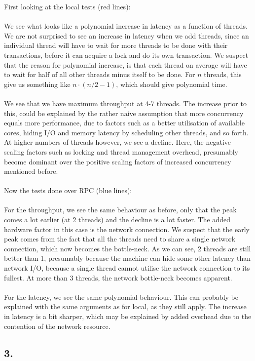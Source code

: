 \documentclass[12pt]{article}
\begin{document}
First looking at the local tests (red lines):
\\
\\
We see what looks like a polynomial increase in latency as a function of threads. We are not surprised to see an increase in latency when we add threads, since an individual thread will have to wait for more threads to be done with their transactions, before it can acquire a lock and do its own transaction. We suspect that the reason for polynomial increase, is that each thread on average will have to wait for half of all other threads minus itself to be done. For $n$ threads, this give us something like $n\cdot(n/2-1)$, which should give polynomial time.
\\
\\
We see that we have maximum throughput at 4-7 threads. The increase prior to this, could be explained by the rather naive assumption that more concurrency equals more performance, due to factors such as a better utilisation of available cores, hiding I/O and memory latency by scheduling other threads, and so forth. At higher numbers of threads however, we see a decline. Here, the negative scaling factors such as locking and thread management overhead, presumably become dominant over the positive scaling factors of increased concurrency mentioned before.
\\
\\
Now the tests done over RPC (blue lines):
\\
\\
For the throughput, we see the same behaviour as before, only that the peak comes a lot earlier (at 2 threads) and the decline is a lot faster. The added hardware factor in this case is the network connection. We suspect that the early peak comes from the fact that all the threads need to share a single network connection, which now becomes the bottle-neck. As we can see, 2 threads are still better than 1, presumably because the machine can hide some other latency than network I/O, because a single thread cannot utilise the network connection to its fullest. At more than 3 threads, the network bottle-neck becomes apparent.
\\
\\
For the latency, we see the same polynomial behaviour. This can probably be explained with the same arguments as for local, as they still apply. The increase in latency is a bit sharper, which may be explained by added overhead due to the contention of the network resource.

\subsection*{3.}
\end{document}
